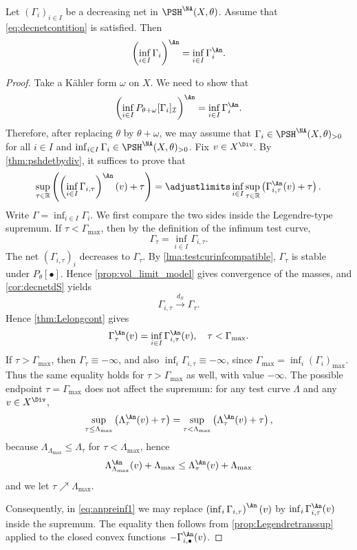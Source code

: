 \begin{proposition}\label{prop:anpreinf}
    Let $(\Gamma_i)_{i\in I}$ be a decreasing net in $\PSH^{\NA}(X,\theta)$. Assume that \eqref{eq:decnetcontition} is satisfied. Then
    \[
        \left( \inf_{i\in I} \Gamma_{i} \right)^{\An}=\inf_{i\in I} \Gamma_{i}^{\An}.
    \]
\end{proposition}
\begin{proof}
    Take a K\"ahler form $\omega$ on $X$. We need to show that
    \[
    \left( \inf_{i\in I} P_{\theta+\omega}[\Gamma_i]_{\mathcal{I}} \right)^{\An}=\inf_{i\in I} \Gamma_{i}^{\An}.
    \]
    Therefore, after replacing $\theta$ by $\theta+\omega$, we may assume that $\Gamma_i\in \PSH^{\NA}(X,\theta)_{>0}$ for all $i\in I$ and $\inf_{i\in I}\Gamma_i\in \PSH^{\NA}(X,\theta)_{>0}$.
    Fix $v\in X^{\Div}$. By \cref{thm:pshdetbydiv}, it suffices to prove that
    \begin{equation}\label{eq:anpreinf1}
        \sup_{\tau\in \mathbb{R}} \left( \left(\inf_{i\in I}\Gamma_{i,\tau}\right)^{\An}(v)+\tau \right)= \adjustlimits\inf_{i\in I}\sup_{\tau\in \mathbb{R}} \left( \Gamma_{i,\tau}^{\An}(v)+\tau \right).
    \end{equation}
    Write $\Gamma=\inf_{i\in I}\Gamma_i$. We first compare the two sides inside the Legendre-type supremum. If $\tau<\Gamma_{\max}$, then by the definition of the infimum test curve,
    \[
        \Gamma_{\tau}=\inf_{i\in I}\Gamma_{i,\tau}.
    \]
    The net $(\Gamma_{i,\tau})_i$ decreases to $\Gamma_{\tau}$. By \cref{lma:testcurinfcompatible}, $\Gamma_{\tau}$ is stable under $P_{\theta}[\bullet]$.
    Hence \cref{prop:vol_limit_model} gives convergence of the masses, and \cref{cor:decnetdS} yields
    \[
        \Gamma_{i,\tau}\xrightarrow{d_S}\Gamma_{\tau}.
    \]
    Hence \cref{thm:Lelongcont} gives
    \[
        \Gamma_{\tau}^{\An}(v)=\inf_{i\in I}\Gamma_{i,\tau}^{\An}(v),\quad \tau<\Gamma_{\max}.
    \]
    If $\tau>\Gamma_{\max}$, then $\Gamma_{\tau}\equiv-\infty$, and also $\inf_i\Gamma_{i,\tau}\equiv-\infty$, since $\Gamma_{\max}=\inf_i(\Gamma_i)_{\max}$. Thus the same equality holds for $\tau>\Gamma_{\max}$ as well, with value $-\infty$. The possible endpoint $\tau=\Gamma_{\max}$ does not affect the supremum: for any test curve $\Lambda$ and any $v\in X^{\Div}$,
    \[
        \sup_{\tau\leq \Lambda_{\max}}\left(\Lambda_{\tau}^{\An}(v)+\tau\right)
        =\sup_{\tau< \Lambda_{\max}}\left(\Lambda_{\tau}^{\An}(v)+\tau\right),
    \]
    because $\Lambda_{\Lambda_{\max}}\leq \Lambda_{\tau}$ for $\tau<\Lambda_{\max}$, hence
    \[
        \Lambda_{\Lambda_{\max}}^{\An}(v)+\Lambda_{\max}
        \leq \Lambda_{\tau}^{\An}(v)+\Lambda_{\max}
    \]
    and we let $\tau\nearrow \Lambda_{\max}$.

    Consequently, in \eqref{eq:anpreinf1} we may replace $\left(\inf_i\Gamma_{i,\tau}\right)^{\An}(v)$ by $\inf_i\Gamma_{i,\tau}^{\An}(v)$ inside the supremum. The equality then follows from \cref{prop:Legendretranssup} applied to the closed convex functions $-\Gamma_{i,\bullet}^{\An}(v)$.
\end{proof}

